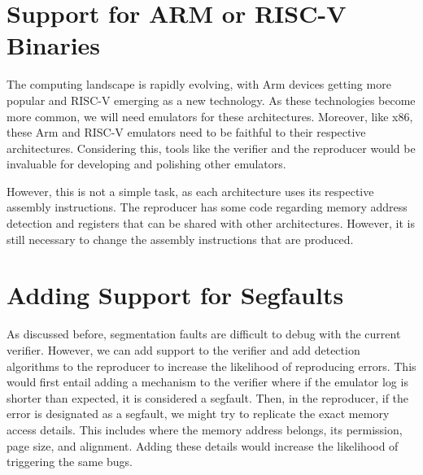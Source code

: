 \section{Support for ARM or RISC-V Binaries}
The computing landscape is rapidly evolving, with Arm devices getting more popular and RISC-V emerging as a new technology.
As these technologies become more common, we will need emulators for these architectures.
Moreover, like x86, these Arm and RISC-V emulators need to be faithful to their respective architectures.
Considering this, tools like the verifier and the reproducer would be invaluable for developing and polishing other emulators.

However, this is not a simple task, as each architecture uses its respective assembly instructions.
The reproducer has some code regarding memory address detection and registers that can be shared with other architectures.
However, it is still necessary to change the assembly instructions that are produced.

\section{Adding Support for Segfaults}
As discussed before, segmentation faults are difficult to debug with the current verifier.
However, we can add support to the verifier and add detection algorithms to the reproducer to increase the likelihood of reproducing errors.
This would first entail adding a mechanism to the verifier where if the emulator log is shorter than expected, it is considered a \ac{segfault}.
Then, in the reproducer, if the error is designated as a \ac{segfault}, we might try to replicate the exact memory access details.
This includes where the memory address belongs, its permission, page size, and alignment.
Adding these details would increase the likelihood of triggering the same bugs.
